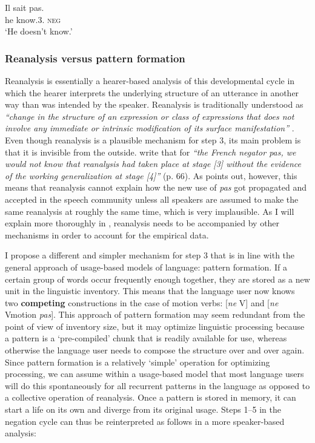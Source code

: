 \ea
\gll Il sait pas.\\
he know.3{\sg}.{\prs} {\textsc{neg}}\\
\glt `He doesn't know.'\\
\z 

\subsubsection{Reanalysis versus pattern formation}
 Reanalysis is essentially a hearer-based analysis of this developmental cycle in which the hearer interprets the underlying structure of an utterance in another way than was intended by the speaker. Reanalysis is traditionally understood as {\em ``change in the structure of an expression or class of expressions that does not involve any immediate or intrinsic modification of its surface manifestation''} \citep[58]{langacker77syntactic}. Even though reanalysis is a plausible mechanism for step 3, its main problem is that it is invisible from the outside. \citet{hopper93grammaticalization} write that for {\em ``the French negator {\em pas}, we would not know that reanalysis had taken place at stage [3] without the evidence of the working generalization at stage [4]''} (p. 66). As \citet{haspelmath98does} points out, however, this means that reanalysis cannot explain how the new use of {\em pas} got propagated and accepted in the speech community unless all speakers are assumed to make the same reanalysis at roughly the same time, which is very implausible. As I will explain more thoroughly in , reanalysis needs to be accompanied by other mechanisms in order to account for the empirical data.

I propose a different and simpler mechanism for step 3 that is in line with the general approach of usage-based models of language: pattern formation. If a certain group of words occur frequently enough together, they are stored as a new unit in the linguistic inventory. This means that the language user now knows two {\bfseries competing} constructions in the case of motion verbs: [{\em ne} V] and [{\em ne} Vmotion {\em pas}]. This approach of pattern formation may seem redundant from the point of view of inventory size, but it may optimize linguistic processing because a pattern is a `pre-compiled' chunk that is readily available for use, whereas otherwise the language user needs to compose the structure over and over again. Since pattern formation is a relatively `simple' operation for optimizing processing, we can assume within a usage-based model that most language users will do this spontaneously for all recurrent patterns in the language as opposed to a collective operation of reanalysis. Once a pattern is stored in memory, it can start a life on its own and diverge from its original usage. Steps 1--5 in the negation cycle can thus be reinterpreted as follows in a more speaker-based analysis:


